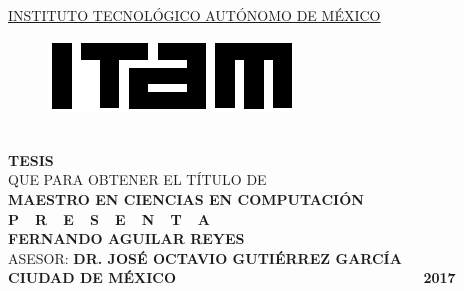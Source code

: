 \begin{titlepage}
\begin{center}

\textsc{\underline{INSTITUTO TECNOLÓGICO AUTÓNOMO DE MÉXICO}}\\[1.5cm] %

\begin{figure}[h]
\centering
\includegraphics[scale=2]{imagenes/logoitam.png}\\[0.5cm] %
\end{figure} 

\huge{\thesisTitle}\\[1.5cm] %


\large \textbf{TESIS}\\ QUE PARA OBTENER EL TÍTULO DE\\ \textbf{MAESTRO EN CIENCIAS EN COMPUTACIÓN}\\[0.8cm]
\large \textbf{P\ \  R\ \  E\ \  S\ \  E\ \  N\ \  T\ \  A}\\[0.8cm]

\textbf{FERNANDO AGUILAR REYES}\\[1.0cm]

\large ASESOR: \textbf{DR. JOSÉ OCTAVIO GUTIÉRREZ GARCÍA}\\[1.4cm]

\large \textbf{CIUDAD DE MÉXICO} {\ \ \ \ \ \ \ \ \ \ \ \ \ \ \ \ \ \ \ \ \ \ \ \ \ \ \ \ \ \ \ \ \ \ } \textbf{2017}

\vfill
\end{center}

\end{titlepage}
